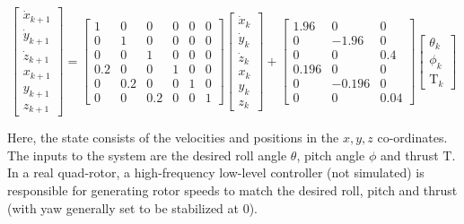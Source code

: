 {\tiny
\begin{equation}
\label{eq:quad_dyn}
\begin{bmatrix} \dot{x}_{k+1} \\ \dot{y}_{k+1} \\ \dot{z}_{k+1} \\ x_{k+1} \\ y_{k+1} \\ z_{k+1} \end{bmatrix}= \begin{bmatrix} 1&0&0&0&0&0 \\0&1&0&0&0&0 \\0&0&1&0&0&0 \\0.2&0&0&1&0&0 \\0&0.2&0&0&1&0 \\0&0&0.2&0&0&1\end{bmatrix} \begin{bmatrix} \dot{x}_{k} \\ \dot{y}_{k} \\ \dot{z}_{k} \\ x_{k} \\ y_{k} \\ z_{k} \end{bmatrix} + \begin{bmatrix} 1.96&0&0 \\ 0&-1.96&0 \\0&0&0.4 \\0.196&0&0 \\0&-0.196&0\\0&0&0.04 \end{bmatrix} \begin{bmatrix} \theta_k \\ \phi_k \\ \text{T}_k \end{bmatrix}
\end{equation}
}

Here, the state consists of the velocities and positions in the $x,y,z$ co-ordinates. The inputs to the system are the desired roll angle $\theta$, pitch angle $\phi$ and thrust $\text{T}$. 
In a real quad-rotor, a high-frequency low-level controller (not simulated) is responsible for generating rotor speeds to match the desired roll, pitch and thrust (with yaw generally set to be stabilized at $0$). 


